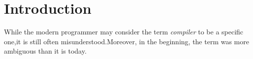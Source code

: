 \chapter{Introduction}While the modern programmer may consider the term \emph{compiler} to be a specific one,it is still often misunderstood.Moreover, in the beginning, the term was more ambiguous than it is today.%